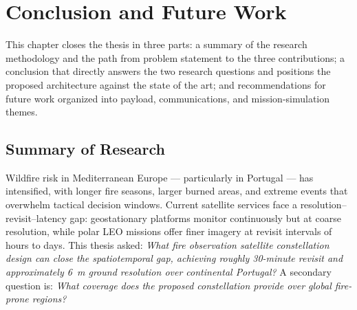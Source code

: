 \chapter{Conclusion and Future Work}
\label{chapter-11-conclusion-and-future-work}

This chapter closes the thesis in three parts: a summary of the research methodology and the path from problem statement to the three contributions; a conclusion that directly answers the two research questions and positions the proposed architecture against the state of the art; and recommendations for future work organized into payload, communications, and mission-simulation themes.

\section{Summary of Research}\label{sec:conclusion-summary}

Wildfire risk in Mediterranean Europe --- particularly in Portugal --- has intensified, with longer fire seasons, larger burned areas, and extreme events that overwhelm tactical decision windows. Current satellite services face a resolution--revisit--latency gap: geostationary platforms monitor continuously but at coarse resolution, while polar LEO missions offer finer imagery at revisit intervals of hours to days. This thesis asked: \emph{What fire observation satellite constellation design can close the spatiotemporal gap, achieving roughly 30-minute revisit and approximately 6~m ground resolution over continental Portugal?} A secondary question is: \emph{What coverage does the proposed constellation provide over global fire-prone regions?}

